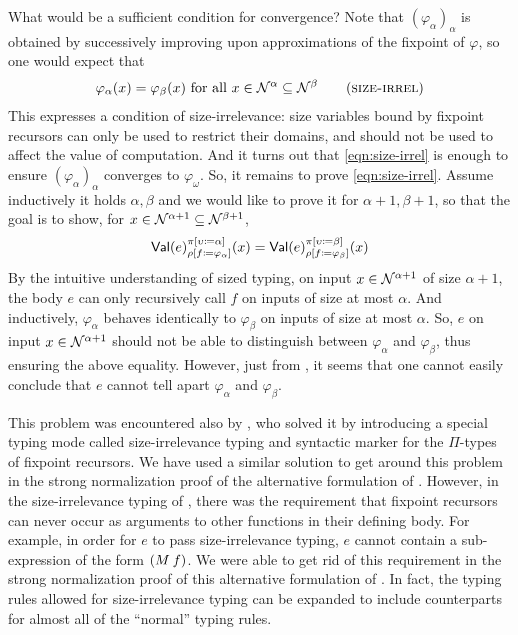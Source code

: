 What would be a sufficient condition for convergence?
%
Note that $(\varphi_\alpha)_\alpha$ is obtained by successively
improving upon approximations of the fixpoint of $\varphi$, so one
would expect that
%
\begin{align*}
  \varphi_\alpha(x) = \varphi_\beta(x) \text{ for all } x \in \McN^\alpha \subseteq \McN^\beta
  \label{eqn:size-irrel}\tag{\textsc{size-irrel}}
\end{align*}
%
This expresses a condition of size-irrelevance: size variables bound
by fixpoint recursors can only be used to restrict their domains, and
should not be used to affect the value of computation.
%
And it turns out that \eqref{eqn:size-irrel} is enough to ensure
$(\varphi_\alpha)_\alpha$ converges to $\varphi_\omega$.
%
So, it remains to prove \eqref{eqn:size-irrel}.
%
Assume inductively it holds $\alpha,\beta$ and we would like to prove
it for $\alpha+1,\beta+1$, so that the goal is to show, for
$x \in \mathcal{N}^{\alpha+1} \subseteq \mathcal{N}^{\beta+1}$,
%
\begin{align*}
  \textsf{Val}(e)_{\rho [f \coloneqq \varphi_\alpha]}^{\pi [\upsilon \coloneqq \alpha]}(x) =
  \textsf{Val}(e)_{\rho [f \coloneqq \varphi_\beta]}^{\pi [\upsilon \coloneqq \beta]}(x)
\end{align*}
%
By the intuitive understanding of sized typing, on input
$x \in \mathcal{N}^{\alpha+1}$ of size $\alpha+1$, the body $e$ can only
recursively call $f$ on inputs of size at most $\alpha$.
%
And inductively, $\varphi_\alpha$ behaves identically to
$\varphi_\beta$ on inputs of size at most $\alpha$.
%
So, $e$ on input $x \in \mathcal{N}^{\alpha+1}$ should not be able to
distinguish between $\varphi_\alpha$ and $\varphi_\beta$, thus
ensuring the above equality.
%
However, just from , it seems that one cannot
easily conclude that $e$ cannot tell apart $\varphi_\alpha$ and
$\varphi_\beta$.

This problem was encountered also by \citet{barras-thesis}, who solved
it by introducing a special typing mode called size-irrelevance typing
and syntactic marker for the $\Pi$-types of fixpoint recursors.
%
We have used a similar solution to get around this problem in the
strong normalization proof of the alternative formulation of \lang.
%
However, in the size-irrelevance typing of \citet{barras-thesis},
there was the requirement that fixpoint recursors can never occur as
arguments to other functions in their defining body.
%
For example, in order for $e$ to pass size-irrelevance typing, $e$
cannot contain a sub-expression of the form $(\app{M}{f})$.
%
We were able to get rid of this requirement in the strong
normalization proof of this alternative formulation of \lang.
%
In fact, the typing rules allowed for size-irrelevance typing can be
expanded to include counterparts for almost all of the ``normal''
typing rules.

